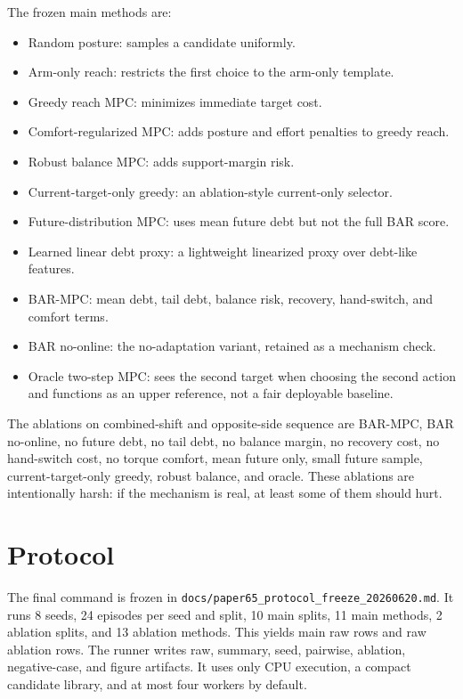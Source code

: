 \documentclass{article}
\newcommand{\method}{\textsc{BAR-MPC}}
\begin{document}
The frozen main methods are:
\begin{itemize}
  \item Random posture: samples a candidate uniformly.
  \item Arm-only reach: restricts the first choice to the arm-only template.
  \item Greedy reach MPC: minimizes immediate target cost.
  \item Comfort-regularized MPC: adds posture and effort penalties to greedy reach.
  \item Robust balance MPC: adds support-margin risk.
  \item Current-target-only greedy: an ablation-style current-only selector.
  \item Future-distribution MPC: uses mean future debt but not the full BAR score.
  \item Learned linear debt proxy: a lightweight linearized proxy over debt-like features.
  \item \method{}: mean debt, tail debt, balance risk, recovery, hand-switch, and comfort terms.
  \item BAR no-online: the no-adaptation variant, retained as a mechanism check.
  \item Oracle two-step MPC: sees the second target when choosing the second action and functions as an upper reference, not a fair deployable baseline.
\end{itemize}

The ablations on combined-shift and opposite-side sequence are \method{}, BAR no-online, no future debt, no tail debt, no balance margin, no recovery cost, no hand-switch cost, no torque comfort, mean future only, small future sample, current-target-only greedy, robust balance, and oracle. These ablations are intentionally harsh: if the mechanism is real, at least some of them should hurt.

\section{Protocol}

The final command is frozen in \texttt{docs/paper65\_protocol\_freeze\_20260620.md}. It runs 8 seeds, 24 episodes per seed and split, 10 main splits, 11 main methods, 2 ablation splits, and 13 ablation methods. This yields \MainRows{} main raw rows and \AblationRows{} raw ablation rows. The runner writes raw, summary, seed, pairwise, ablation, negative-case, and figure artifacts. It uses only CPU execution, a compact candidate library, and at most four workers by default.
\end{document}
